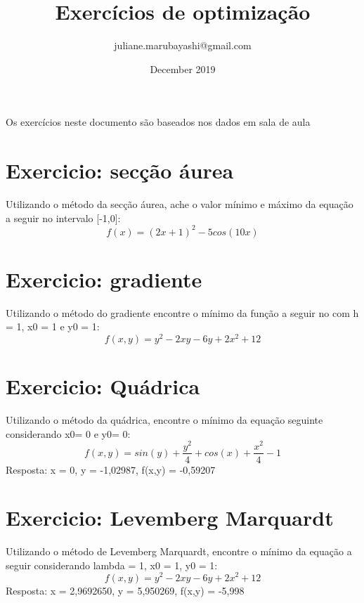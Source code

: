 \documentclass{article}
\title{Exercícios de optimização}
\author{juliane.marubayashi@gmail.com}
\date{December 2019}
\begin{document}
 
\maketitle

Os exercícios neste documento são baseados nos dados em sala de aula
\section{Exercicio: secção áurea}
Utilizando o método da secção áurea, ache o valor mínimo e máximo da equação a seguir no intervalo [-1,0]:
$$ f(x) = (2x+1)^2 -5cos(10x)$$ 

\section{Exercicio: gradiente}
Utilizando o método do gradiente encontre o mínimo da função a seguir no com h = 1, x0 = 1 e y0 = 1: 
$$ f(x,y) = y^2 - 2xy - 6y + 2x^2 +12$$

\section{Exercicio: Quádrica}
Utilizando o método da quádrica, encontre o mínimo da equação seguinte considerando x0= 0 e y0= 0:
$$ f(x,y) = sin(y)+ \frac{y^2}{4} + cos(x) + \frac{x^2}{4} -1$$
Resposta: x = 0, y = -1,02987, f(x,y) = -0,59207

\section{Exercicio: Levemberg Marquardt}
Utilizando o método de Levemberg Marquardt, encontre o mínimo da equação a seguir considerando lambda = 1, x0 = 1, y0 = 1: 
$$ f(x,y) = y^2-2xy -6y +2x^2+12$$
Resposta: x = 2,9692650, y = 5,950269, f(x,y) = -5,998
\end{document}
